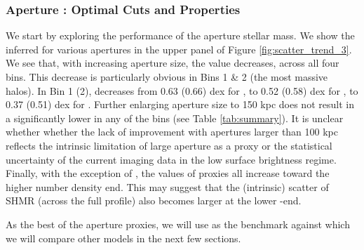 \documentclass[fleqn,usenatbib,useAMS,english]{mnras}
\begin{document}
\subsubsection{Aperture \mstar: Optimal Cuts and \dsigma{} Properties}
    \label{sec:m_aper}

    We start by exploring the performance of the aperture stellar mass.
    We show the inferred \sigmvir{} for various apertures in the upper panel of Figure
    \ref{fig:scatter_trend_3}. 
    We see that, with increasing aperture size, the \sigmvir{} value decreases, across all four bins.
    This decrease is particularly obvious in Bins 1 \& 2 (the most massive halos).
    In Bin 1 (2), \sigmvir{} decreases from 0.63 (0.66) dex for , to 0.52 (0.58)
    dex for , to 0.37 (0.51) dex for .
    Further enlarging aperture size to 150 kpc does not result in a significantly lower
    \sigmvir{} in any of the bins (see Table \ref{tab:summary}).
    It is unclear whether whether the lack of improvement with apertures larger than
    100 kpc reflects the intrinsic limitation of large aperture \mstar{} as a \mvir{} proxy
    or the statistical uncertainty of the current imaging data in the low surface brightness regime.
    Finally, with the exception of , the \sigmvir{} values of \mstar{} proxies all
    increase toward the higher number density end.
    This may suggest that the (intrinsic) scatter of SHMR (across the full profile) also
    becomes larger at the lower \mvir{}-end.

    As the best of the aperture \mstar{} proxies, we will use  as the benchmark
    against which we will compare other models in the next few sections.
    
\end{document}
